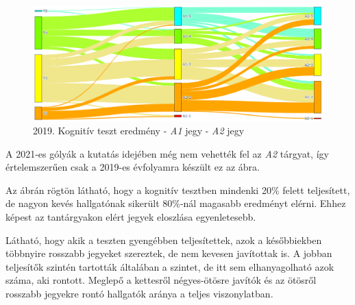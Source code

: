 \documentclass[12pt]{article}
\begin{document}





\begin{figure}[H]
\centering
\includegraphics[scale=0.573]{kepek/teszt-a1-a2.png}
\caption{2019. Kognitív teszt eredmény - \textit{A1} jegy - \textit{A2} jegy}
\label{fig:teszt-a1-a2}
\end{figure}

A 2021-es gólyák a kutatás idejében még nem vehették fel az \textit{A2} tárgyat, így értelemszerűen csak a 2019-es évfolyamra készült ez az ábra.

Az ábrán rögtön látható, hogy a kognitív tesztben mindenki 20\% felett teljesített, de nagyon kevés hallgatónak sikerült 80\%-nál magasabb eredményt elérni. Ehhez képest az tantárgyakon elért jegyek eloszlása egyenletesebb. 

Látható, hogy akik a teszten gyengébben teljesítettek, azok a későbbiekben többnyire rosszabb jegyeket szereztek, de nem kevesen javítottak is. A jobban teljesítők szintén tartották általában a szintet, de itt sem elhanyagolható azok száma, aki rontott. Meglepő a kettesről négyes-ötösre javítók és az ötösről rosszabb jegyekre rontó hallgatók aránya a teljes viszonylatban.
\end{document}

